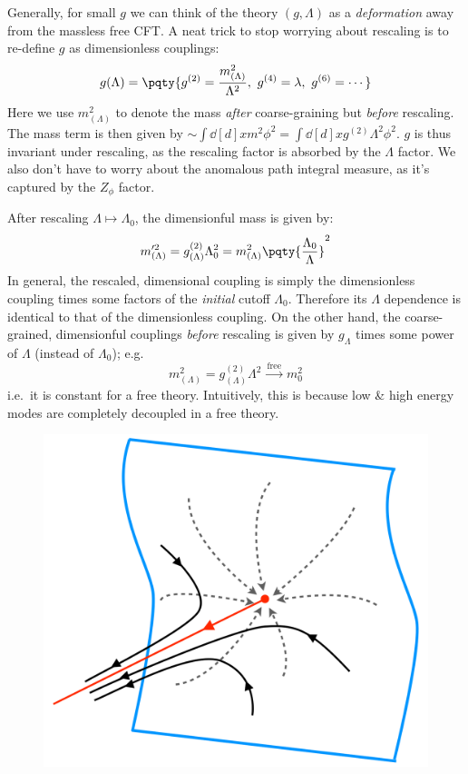 \documentclass[a4paper
	,10pt
]{article}
\begin{document}
	Generally, for small $g$ we can think of the theory $(g,\Lambda)$ as a \textit{deformation} away from the massless free CFT. A neat trick to stop worrying about rescaling is to re-define $g$ as dimensionless couplings:
	\begin{equation}
		g(\Lambda) = \pqty{
			g^{(2)} = \frac{m^2_{(\Lambda)}}{\Lambda^2},
			\ g^{(4)} = \lambda,
			\ g^{(6)} = \cdots
		}
	\end{equation}
	Here we use $m^2_{(\Lambda)}$ to denote the mass \textit{after} coarse-graining but \textit{before} rescaling. The mass term is then given by $
		\sim \int \dd[d]{x} m^2 \phi^2
		= \int \dd[d]{x} g^{(2)} \Lambda^2 \phi^2
	$. $g$ is thus invariant under rescaling, as the rescaling factor is absorbed by the $\Lambda$ factor. We also don't have to worry about the anomalous path integral measure, as it's captured by the $Z_\phi$ factor. 
	
	After rescaling $\Lambda \mapsto \Lambda_0$, the dimensionful mass is given by:
	\begin{equation}
		m'^2_{(\Lambda)}
		= g^{(2)}_{(\Lambda)} \Lambda_0^2
		= m^2_{(\Lambda)}
			\pqty{\frac{\Lambda_0}{\Lambda}}^2
	\end{equation}
	In general, the rescaled, dimensional coupling is simply the dimensionless coupling times some factors of the \textit{initial} cutoff $\Lambda_0$. Therefore its $\Lambda$ dependence is identical to that of the dimensionless coupling. On the other hand, the coarse-grained, dimensionful couplings \textit{before} rescaling is given by $g_{\Lambda}$ times some power of $\Lambda$ (instead of $\Lambda_0$); e.g.
	\begin{equation}
		m^2_{(\Lambda)}
		= g^{(2)}_{(\Lambda)} \Lambda^2
		\xrightarrow{\ \text{free}\ }
		m_0^2
	\end{equation}
	i.e.\ it is constant for a free theory. Intuitively, this is because low \& high energy modes are completely decoupled in a free theory.
	
	\begin{figure}[!h]
	\centering
	\includegraphics[width=.35\linewidth]{img/RG-flow.png}
	\end{figure}
\end{document}
